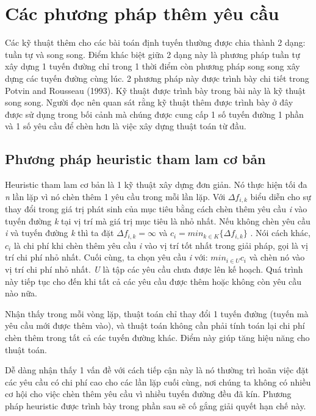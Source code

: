 \section{Các phương pháp thêm yêu cầu}
Các kỹ thuật thêm cho các bài toán định tuyến thường được chia thành 2 dạng: tuần tự và song song. Điểm khác biệt giữa 2 dạng này là phương pháp tuần tự xây dựng 1 tuyến đường chỉ trong 1 thời điểm còn phương pháp song song xây dựng các tuyến đường cùng lúc. 2 phương pháp này được trình bày chi tiết trong Potvin and Rousseau (1993). Kỹ thuật được trình bày trong bài này là kỹ thuật song song. Người đọc nên quan sát rằng kỹ thuật thêm được trình bày ở đây được sử dụng trong bối cảnh mà chúng được cung cấp 1 số tuyến đường 1 phần và 1 số yêu cầu để chèn hơn là việc xây dựng thuật toán từ đầu.

\subsection{Phương pháp heuristic tham lam cơ bản}
Heuristic tham lam cơ bản là 1 kỹ thuật xây dựng đơn giản. Nó thực hiện tối đa \textit{n} lần lặp vì nó chèn thêm 1 yêu cầu trong mỗi lần lặp. Với $\Delta f_{i, k}$ biểu diễn cho sự thay đổi trong giá trị phát sinh của mục tiêu bằng cách chèn thêm yêu cầu \textit{i} vào tuyến đường \textit{k} tại vị trí mà giá trị mục tiêu là nhỏ nhất. Nếu không chèn yêu cầu \textit{i} và tuyến đường \textit{k} thì ta đặt $\Delta f_{i, k} = \infty$ và $c_i = min_{k \in K}\{\Delta f_{i, k}\}$ . Nói cách khác, $c_i$ là chi phí khi chèn thêm yêu cầu \textit{i} vào vị trí tốt nhất trong giải pháp, gọi là vị trí chi phí nhỏ nhất. Cuối cùng, ta chọn yêu cầu \textit{i} với: $min_{i \in U} c_i$ và chèn nó vào vị trí chi phí nhỏ nhất. \textit{U} là tập các yêu cầu chưa được lên kế hoạch. Quá trình này tiếp tục cho đến khi tất cả các yêu cầu được thêm hoặc không còn yêu cầu nào nữa.

Nhận thấy trong mỗi vòng lặp, thuật toán chỉ thay đổi 1 tuyến đường (tuyến mà yêu cầu mới được thêm vào), và thuật toán không cần phải tính toán lại chi phí chèn thêm trong tất cả các tuyến đường khác. Điểm này giúp tăng hiệu năng cho thuật toán.

Dễ dàng nhận thấy 1 vấn đề với cách tiếp cận này là nó thường trì hoãn việc đặt các yêu cầu có chi phí cao cho các lần lặp cuối cùng, nơi chúng ta không có nhiều cơ hội cho việc chèn thêm yêu cầu vì nhiều tuyến đường đều đã kín. Phương pháp heuristic được trình bày trong phần sau sẽ cố gắng giải quyết hạn chế này.

